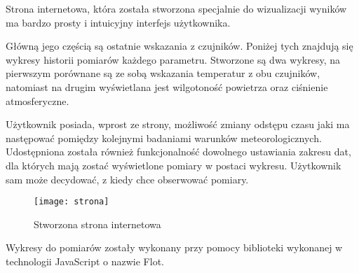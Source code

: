 Strona internetowa, która została stworzona specjalnie do wizualizacji wyników ma bardzo prosty i intuicyjny interfejs użytkownika.

Główną jego częścią są ostatnie wskazania z czujników. Poniżej tych znajdują się wykresy historii pomiarów każdego parametru. Stworzone są dwa wykresy, na pierwszym porównane są ze sobą wskazania temperatur z obu czujników, natomiast na drugim wyświetlana jest wilgotoność powietrza oraz ciśnienie atmosferyczne.

Użytkownik posiada, wprost ze strony, możliwość zmiany odstępu czasu jaki ma następować pomiędzy kolejnymi badaniami warunków meteorologicznych. Udostępniona została również funkcjonalność dowolnego ustawiania zakresu dat, dla których mają zostać wyświetlone pomiary w postaci wykresu. Użytkownik sam może decydować, z kiedy chce obserwować pomiary.
\begin{figure}[h!]
\centering
\texttt{[image: strona]}
\caption{Stworzona strona internetowa}
\label{fig:strona}
\end{figure}

Wykresy do pomiarów zostały wykonany przy pomocy biblioteki wykonanej w technologii JavaScript o nazwie Flot.